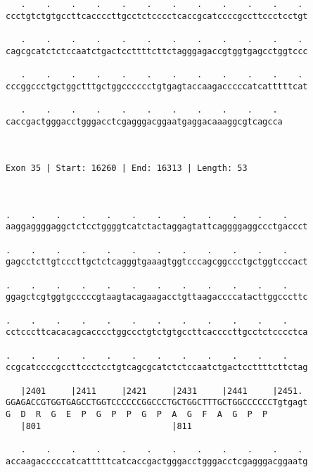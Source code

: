\documentclass{article}
\begin{document}
\begin{Verbatim}
   .    .    .    .    .    .    .    .    .    .    .    . 
ccctgtctgtgccttcaccccttgcctctcccctcaccgcatccccgccttccctcctgt
                                                            
   .    .    .    .    .    .    .    .    .    .    .    . 
cagcgcatctctccaatctgactccttttcttctagggagaccgtggtgagcctggtccc
                                                            
   .    .    .    .    .    .    .    .    .    .    .    . 
cccggccctgctggctttgctggcccccctgtgagtaccaagacccccatcatttttcat
                                                            
   .    .    .    .    .    .    .    .    .    .    . 
caccgactgggacctgggacctcgagggacggaatgaggacaaaggcgtcagcca
                                                       
                                                       
 
Exon 35 | Start: 16260 | End: 16313 | Length: 53



.    .    .    .    .    .    .    .    .    .    .    .    
aaggaggggaggctctcctggggtcatctactaggagtattcaggggaggccctgaccct
                                                            
.    .    .    .    .    .    .    .    .    .    .    .    
gagcctcttgtcccttgctctcagggtgaaagtggtcccagcggccctgctggtcccact
                                                            
.    .    .    .    .    .    .    .    .    .    .    .    
ggagctcgtggtgcccccgtaagtacagaagacctgttaagaccccatacttggcccttc
                                                            
.    .    .    .    .    .    .    .    .    .    .    .    
cctcccttcacacagcacccctggccctgtctgtgccttcaccccttgcctctcccctca
                                                            
.    .    .    .    .    .    .    .    .    .    .    .    
ccgcatccccgccttccctcctgtcagcgcatctctccaatctgactccttttcttctag
                                                            
   |2401     |2411     |2421     |2431     |2441     |2451. 
GGAGACCGTGGTGAGCCTGGTCCCCCCGGCCCTGCTGGCTTTGCTGGCCCCCCTgtgagt
G  D  R  G  E  P  G  P  P  G  P  A  G  F  A  G  P  P        
   |801                          |811                       
  
   .    .    .    .    .    .    .    .    .    .    .    . 
accaagacccccatcatttttcatcaccgactgggacctgggacctcgagggacggaatg
                                                            

\end{Verbatim}
\end{document}
